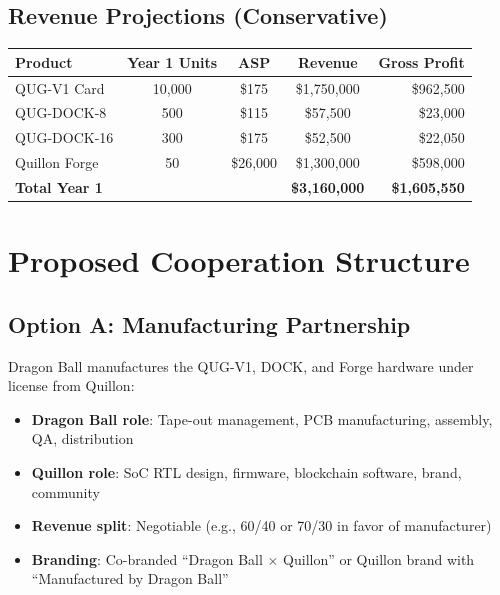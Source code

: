 \documentclass[11pt,a4paper]{article}
\begin{document}
\subsection{Revenue Projections (Conservative)}

\begin{center}
\begin{tabular}{@{}lcccr@{}}
\toprule
\textbf{Product} & \textbf{Year 1 Units} & \textbf{ASP} & \textbf{Revenue} & \textbf{Gross Profit} \\
\midrule
QUG-V1 Card & 10{,}000 & \$175 & \$1{,}750{,}000 & \$962{,}500 \\
QUG-DOCK-8 & 500 & \$115 & \$57{,}500 & \$23{,}000 \\
QUG-DOCK-16 & 300 & \$175 & \$52{,}500 & \$22{,}050 \\
Quillon Forge & 50 & \$26{,}000 & \$1{,}300{,}000 & \$598{,}000 \\
\midrule
\textbf{Total Year 1} & & & \textbf{\$3{,}160{,}000} & \textbf{\$1{,}605{,}550} \\
\bottomrule
\end{tabular}
\end{center}


\section{Proposed Cooperation Structure}

\subsection{Option A: Manufacturing Partnership}

Dragon Ball manufactures the QUG-V1, DOCK, and Forge hardware under license from Quillon:

\begin{itemize}[leftmargin=1.5em]
    \item \textbf{Dragon Ball role}: Tape-out management, PCB manufacturing, assembly, QA, distribution
    \item \textbf{Quillon role}: SoC RTL design, firmware, blockchain software, brand, community
    \item \textbf{Revenue split}: Negotiable (e.g., 60/40 or 70/30 in favor of manufacturer)
    \item \textbf{Branding}: Co-branded ``Dragon Ball $\times$ Quillon'' or Quillon brand with ``Manufactured by Dragon Ball''
\end{itemize}
\end{document}
